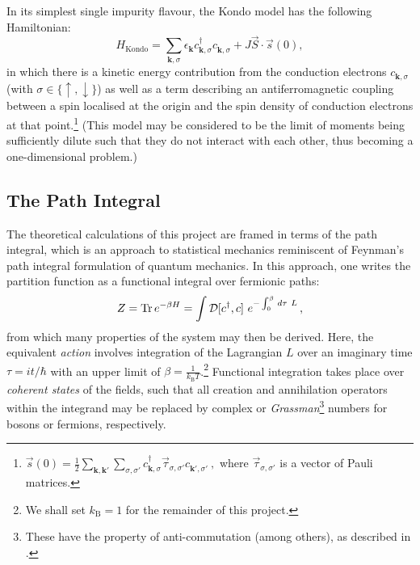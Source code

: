 In its simplest single impurity flavour, the Kondo model has the following Hamiltonian: \begin{equation} H_{\text{Kondo}}=\sum_{\boldsymbol{k},\sigma}\epsilon_{\boldsymbol{k}} c_{\boldsymbol{k},\sigma}^{\dagger}c^{}_{\boldsymbol{k},\sigma} + J\vec{S}\cdot\vec{s}(0) , \label{eq:KondoHamiltonian}\end{equation} in which there is a kinetic energy contribution from the conduction electrons $ c^{}_{\boldsymbol{k}, \sigma}$ (with $ \sigma \in \{ \uparrow , \downarrow \}$) as well as a term describing an antiferromagnetic coupling between a spin localised at the origin and the spin density of conduction electrons at that point.\footnote{$ \vec{s}(0) = \frac{1}{2} \sum_{\boldsymbol{k}, \boldsymbol{k'}} \sum_{\sigma, \sigma'} c^{\dagger}_{\boldsymbol{k}, \sigma} \vec{\tau}_{\sigma, \sigma'} c^{}_{\boldsymbol{k'}, \sigma'} ~, $ where $ \vec{\tau}_{\sigma, \sigma'} $ is a vector of Pauli matrices.} (This model may be considered to be the limit of moments being sufficiently dilute such that they do not interact with each other, thus becoming a one-dimensional problem.)


\subsection{The Path Integral}

The theoretical calculations of this project are framed in terms of the path integral, which is an approach to statistical mechanics reminiscent of Feynman's path integral formulation of quantum mechanics. In this approach, one writes the partition function as a functional integral over fermionic paths: $$ Z = \operatorname{Tr}{e^{- \beta H}} = \int \mathcal{D} [c^\dagger, c]~e^{-\int_{0}^{\beta} \,d\tau~L}\,, $$ from which many properties of the system may then be derived. Here, the equivalent \emph{action} involves integration of the Lagrangian $ L $ over an imaginary time $ \tau = i t / \hbar $ with an upper limit of $ \beta = \frac{1}{k_{\text{B}} T} $.\footnote{We shall set $ k_{\text{B}} = 1 $ for the remainder of this project.} Functional integration takes place over \emph{coherent states} of the fields, such that all creation and annihilation operators within the integrand may be replaced by complex or \emph{Grassman}\footnote{These have the property of anti-commutation (among others), as described in \cite{ManyBodyPhysics}.} numbers for bosons or fermions, respectively.

